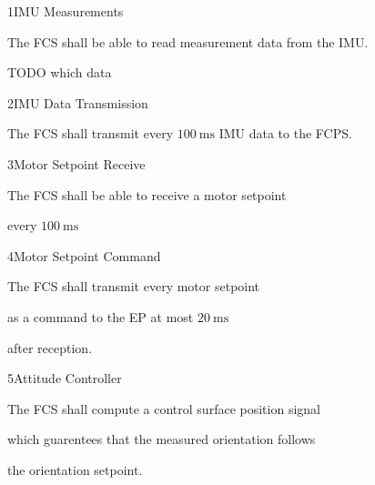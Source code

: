 \req
	{1}{IMU Measurements}
	{

        The FCS shall be able to read measurement data from the IMU.



        TODO which data

    }
	{}

\req
	{2}{IMU Data Transmission}
	{

        The FCS shall transmit every $\SI{100}{\milli\second}$ IMU data to the FCPS.

    }
	{}

\req
	{3}{Motor Setpoint Receive}
	{

        The FCS shall be able to receive a motor setpoint

        every $\SI{100}{\milli\second}$

    }
	{}

\req
	{4}{Motor Setpoint Command}
	{

        The FCS shall transmit every motor setpoint

        as a command to the EP at most $\SI{20}{\milli\second}$

        after reception. 

    }
	{}

\req
	{5}{Attitude Controller}
	{

        The FCS shall compute a control surface position signal 

        which guarentees that the measured orientation follows

        the orientation setpoint.

    }
	{}

